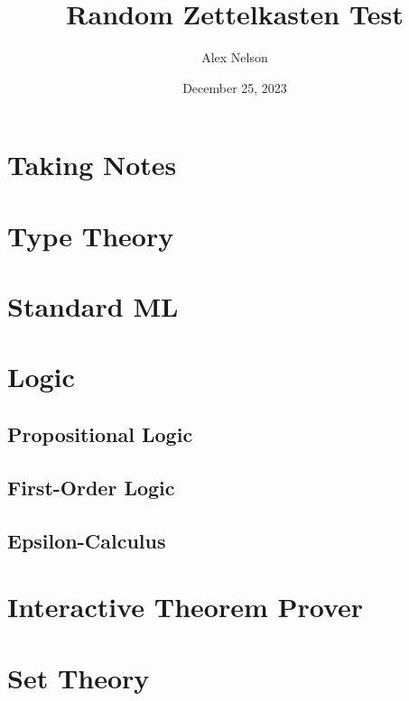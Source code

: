\documentclass[dvipsnames,HTML]{amsbook}
\title{Random Zettelkasten Test}
\author{Alex Nelson}
\date{December 25, 2023}
\begin{document}
\frontmatter
\maketitle
\tableofcontents
\mainmatter
\vfill\eject
\chapter{Taking Notes}


\chapter{Type Theory}


\chapter{Standard ML}


\chapter{Logic}
\section{Propositional Logic}

\section{First-Order Logic}

\section{Epsilon-Calculus}


\chapter{Interactive Theorem Prover}


\chapter{Set Theory}

% 

\backmatter
\nocite{*}

\end{document}
